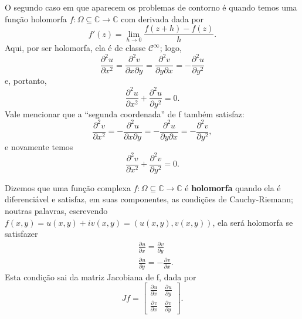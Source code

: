 \documentclass[../pde_notes.tex]{subfiles}
\begin{document}
O segundo caso em que aparecem os problemas de contorno é quando temos uma função holomorfa \(f:\Omega \subseteq \mathbb{C}\rightarrow \mathbb{C}\) com derivada dada por
\[
	f'(z) = \lim_{h\to 0} \frac{f(z+h) - f(z)}{h}.
\]
Aqui, por ser holomorfa, ela é de classe \(\mathcal{C}^{\infty}\); logo,
\[
	\frac{\partial^{2}u}{\partial x^{2}} = \frac{\partial^{2}v}{\partial x \partial y^{}} = \frac{\partial^{2}v}{\partial y \partial x^{}} = - \frac{\partial^{2}u}{\partial y^{2}}
\]
e, portanto,
\[
	\frac{\partial^{2}u}{\partial x^{2}} + \frac{\partial^{2}u}{\partial y^{2}} = 0.
\]
Vale mencionar que a ``segunda coordenada'' de f também satisfaz:
\[
	\frac{\partial^{2}v}{\partial x^{2}} = - \frac{\partial^{2}u}{\partial x \partial y^{}} = - \frac{\partial^{2}u}{\partial y \partial x^{}} = - \frac{\partial^{2}v}{\partial y^{2}},
\]
e novamente temos
\[
	\frac{\partial^{2}v}{\partial x^{2}} + \frac{\partial^{2}v}{\partial y^{2}} = 0.
\]
\begin{tcolorbox}[
		skin=enhanced,
		title=Lembrete!,
		after title={\hfill Função Holomorfa},
		fonttitle=\bfseries,
		sharp corners=downhill,
		colframe=black,
		colbacktitle=yellow!75!white,
		colback=yellow!30,
		colbacklower=black,
		coltitle=black,
		drop large lifted shadow
	]
	Dizemos que uma função complexa \(f:\Omega \subseteq \mathbb{C}\rightarrow \mathbb{C} \) é \textbf{holomorfa} quando ela é diferenciável e satisfaz, em suas componentes, as condições de Cauchy-Riemann; noutras palavras, escrevendo \(f(x, y) = u(x, y) + i v(x, y) = (u(x, y), v(x, y))\), ela será holomorfa se satisfazer
	\hypertarget{cauchy_riemann}{
		\begin{align*}
			 & \frac{\partial^{}u}{\partial x^{}} = \frac{\partial^{}v}{\partial y^{}}   \\
			 & \frac{\partial^{}u}{\partial y^{}} = -\frac{\partial^{}v}{\partial x^{}}.
		\end{align*}
	}
	Esta condição sai da matriz Jacobiana de f, dada por
	\[
		Jf = \begin{bmatrix}
			\frac{\partial^{}u}{\partial x^{}} & \frac{\partial^{}u}{\partial y^{}} \\
			\frac{\partial^{}v}{\partial x^{}} & \frac{\partial^{}v}{\partial y^{}}
		\end{bmatrix}.
	\]
\end{tcolorbox}
\end{document}

